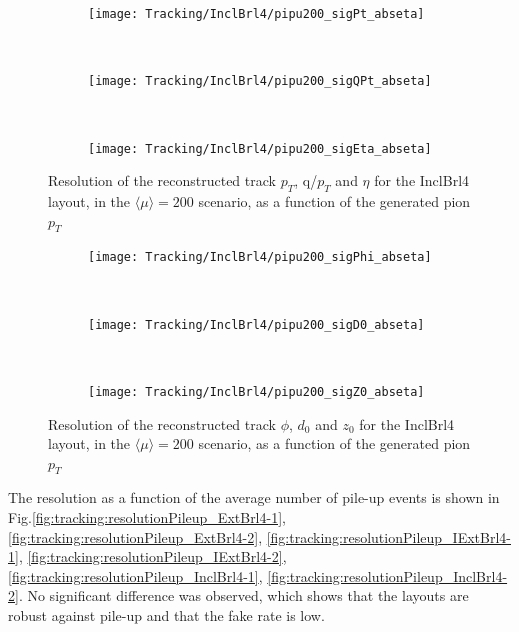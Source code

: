 \documentclass[a4paper,twoside,12pt]{book}
\begin{document}
\begin{figure}
\begin{subfigure}{\linewidth}
\centering
\texttt{[image: Tracking/InclBrl4/pipu200\_sigPt\_abseta]}
\caption{}
\label{fig:tracking:pipu200_sigPt_abseta}
\end{subfigure}\\[1ex]
\begin{subfigure}{\linewidth}
\centering
\texttt{[image: Tracking/InclBrl4/pipu200\_sigQPt\_abseta]}
\caption{}
\label{fig:tracking:pipu200_sigQPt_abseta}
\end{subfigure}\\[1ex]
\begin{subfigure}{\linewidth}
\centering
\texttt{[image: Tracking/InclBrl4/pipu200\_sigEta\_abseta]}
\caption{}
\label{fig:tracking:pipu200_sigEta_abseta}
\end{subfigure}
\caption{Resolution of the reconstructed track $p_{T}$, q/$p_{T}$ and $\eta$ for the InclBrl4 layout, in the $\langle\mu\rangle = 200$ scenario, as a function of the generated pion $p_{T}$}
\label{fig:tracking:pionPt-1}
\end{figure}

\begin{figure}
\begin{subfigure}{\linewidth}
\centering
\texttt{[image: Tracking/InclBrl4/pipu200\_sigPhi\_abseta]}
\caption{}
\label{fig:tracking:pipu200_sigPhi_abseta}
\end{subfigure}\\[1ex]
\begin{subfigure}{\linewidth}
\centering
\texttt{[image: Tracking/InclBrl4/pipu200\_sigD0\_abseta]}
\caption{}
\label{fig:tracking:pipu200_sigD0_abseta}
\end{subfigure}\\[1ex]
\begin{subfigure}{\linewidth}
\centering
\texttt{[image: Tracking/InclBrl4/pipu200\_sigZ0\_abseta]}
\caption{}
\label{fig:tracking:pipu200_sigZ0_abseta}
\end{subfigure}
\caption{Resolution of the reconstructed track $\phi$, $d_{0}$ and $z_{0}$ for the InclBrl4 layout, in the $\langle\mu\rangle = 200$ scenario, as a function of the generated pion $p_{T}$}
\label{fig:tracking:pionPt-2}
\end{figure}


The resolution as a function of the average number of pile-up events is shown in Fig.\ref{fig:tracking:resolutionPileup_ExtBrl4-1}, \ref{fig:tracking:resolutionPileup_ExtBrl4-2},
\ref{fig:tracking:resolutionPileup_IExtBrl4-1}, \ref{fig:tracking:resolutionPileup_IExtBrl4-2},\ref{fig:tracking:resolutionPileup_InclBrl4-1}, \ref{fig:tracking:resolutionPileup_InclBrl4-2}. No significant difference was observed, 
which shows that the layouts are robust against pile-up and that the fake rate is low.\\
\end{document}
